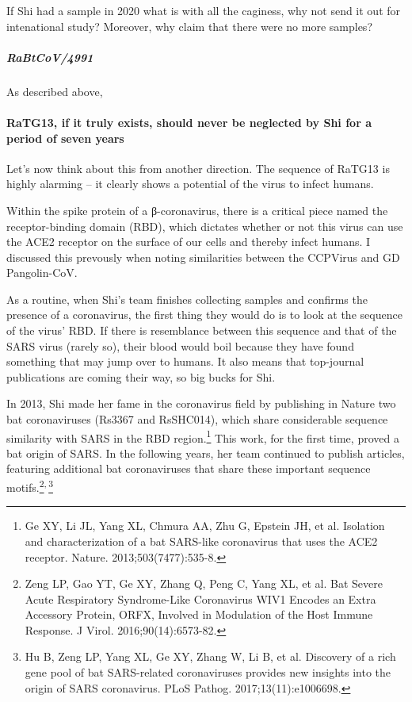 \documentclass[11pt]{article}
\begin{document}
If Shi had a sample in 2020 what is with all the caginess, why not send it out for intenational study? Moreover, why claim that there were no more samples?

\subparagraph{RaBtCoV/4991}
\label{sec:org4edc495}
As described above,

\paragraph{RaTG13, if it truly exists, should never be neglected by Shi for a period of seven years}
\label{sec:org5cfbffb}
Let’s now think about this from another direction. The sequence of RaTG13 is highly alarming – it clearly shows a potential of the virus to infect humans.

Within the spike protein of a β-coronavirus, there is a critical piece named the receptor-binding domain (RBD), which dictates whether or not this virus can use the ACE2 receptor on the surface of our cells and thereby infect humans. I discussed this prevously when noting similarities between the CCPVirus and GD Pangolin-CoV.

As a routine, when Shi’s team finishes collecting samples and confirms the presence of a coronavirus, the first thing they would do is to look at the sequence of the virus’ RBD. If there is resemblance between this sequence and that of the SARS virus (rarely so), their blood would boil because they have found something that may jump over to humans. It also means that top-journal publications are coming their way, so big bucks for Shi.

In 2013, Shi made her fame in the coronavirus field by publishing in Nature two bat coronaviruses (Rs3367 and RsSHC014), which share considerable sequence similarity with SARS in the RBD region.\footnote{Ge XY, Li JL, Yang XL, Chmura AA, Zhu G, Epstein JH, et al. Isolation and characterization of a bat SARS-like coronavirus that uses the ACE2 receptor. Nature. 2013;503(7477):535-8.} This work, for the first time, proved a bat origin of SARS. In the following years, her team continued to publish articles, featuring additional bat coronaviruses that share these important sequence motifs.\footnote{Zeng LP, Gao YT, Ge XY, Zhang Q, Peng C, Yang XL, et al. Bat Severe Acute Respiratory Syndrome-Like Coronavirus WIV1 Encodes an Extra Accessory Protein, ORFX, Involved in Modulation of the Host Immune Response. J Virol. 2016;90(14):6573-82.}\textsuperscript{,}\,\footnote{Hu B, Zeng LP, Yang XL, Ge XY, Zhang W, Li B, et al. Discovery of a rich gene pool of bat SARS-related coronaviruses provides new insights into the origin of SARS coronavirus. PLoS Pathog. 2017;13(11):e1006698.}
\end{document}
